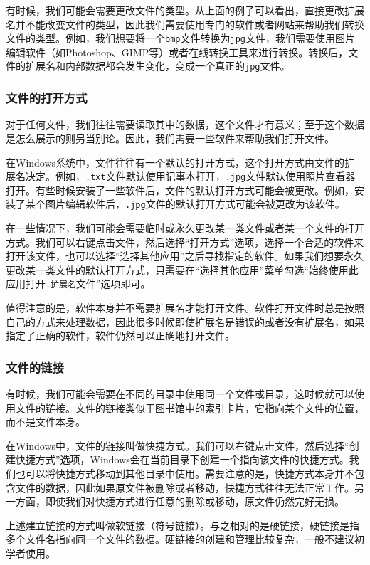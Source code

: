 \documentclass[../main.tex]{subfiles}
\begin{document}
有时候，我们可能会需要更改文件的类型。从上面的例子可以看出，直接更改扩展名并不能改变文件的类型，因此我们需要使用专门的软件或者网站来帮助我们转换文件的类型。例如，我们想要将一个\texttt{bmp}文件转换为\texttt{jpg}文件，我们需要使用图片编辑软件（如Photoshop、GIMP等）或者在线转换工具来进行转换。转换后，文件的扩展名和内部数据都会发生变化，变成一个真正的\texttt{jpg}文件。

\subsubsection{文件的打开方式}

对于任何文件，我们往往需要读取其中的数据，这个文件才有意义；至于这个数据是怎么展示的则另当别论。因此，我们需要一些软件来帮助我们打开文件。

在Windows系统中，文件往往有一个默认的打开方式，这个打开方式由文件的扩展名决定。例如，\texttt{.txt}文件默认使用记事本打开，\texttt{.jpg}文件默认使用照片查看器打开。有些时候安装了一些软件后，文件的默认打开方式可能会被更改。例如，安装了某个图片编辑软件后，\texttt{.jpg}文件的默认打开方式可能会被更改为该软件。

在一些情况下，我们可能会需要临时或永久更改某一类文件或者某一个文件的打开方式。我们可以右键点击文件，然后选择“打开方式”选项，选择一个合适的软件来打开该文件，也可以选择“选择其他应用”之后寻找指定的软件。如果我们想要永久更改某一类文件的默认打开方式，只需要在“选择其他应用”菜单勾选“始终使用此应用打开\texttt{.扩展名}文件”选项即可。

值得注意的是，软件本身并不需要扩展名才能打开文件。软件打开文件时总是按照自己的方式来处理数据，因此很多时候即使扩展名是错误的或者没有扩展名，如果指定了正确的软件，软件仍然可以正确地打开文件。

\subsubsection{文件的链接}

有时候，我们可能会需要在不同的目录中使用同一个文件或目录，这时候就可以使用文件的链接。文件的链接类似于图书馆中的索引卡片，它指向某个文件的位置，而不是文件本身。

在Windows中，文件的链接叫做快捷方式。我们可以右键点击文件，然后选择“创建快捷方式”选项，Windows会在当前目录下创建一个指向该文件的快捷方式。我们也可以将快捷方式移动到其他目录中使用。需要注意的是，快捷方式本身并不包含文件的数据，因此如果原文件被删除或者移动，快捷方式往往无法正常工作。另一方面，即使我们对快捷方式进行任意的删除或移动，原文件仍然完好无损。

上述建立链接的方式叫做软链接（符号链接）。与之相对的是硬链接，硬链接是指多个文件名指向同一个文件的数据。硬链接的创建和管理比较复杂，一般不建议初学者使用。
\end{document}
